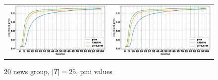\documentclass[12pt]{article}
\begin{document}
\begin{figure}[htb]
\centering
  \begin{tabular}{@{}cc@{}}
    \includegraphics[width=.5\linewidth]{pictures/20news_25t_avg_top10_pmis.eps} &
    \includegraphics[width=.5\linewidth]{pictures/20news_25t_avg_top10_pmis.eps} 
  \end{tabular}
  \caption{20 news group, $|T| = 25$, pmi values}
\end{figure}
\end{document}
